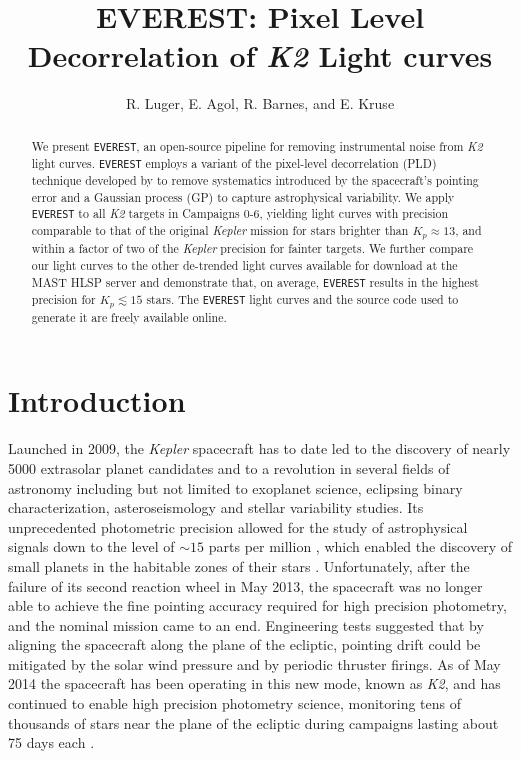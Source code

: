\documentclass[]{emulateapj}
\begin{document}
\title{EVEREST: Pixel Level Decorrelation of \emph{K2} Light curves}

\author{R. Luger, E. Agol, R. Barnes, and E. Kruse}

\begin{abstract}
We present \texttt{EVEREST}, an open-source pipeline for removing instrumental noise
from \emph{K2} light curves. \texttt{EVEREST} employs a variant of the pixel-level decorrelation (PLD)
technique developed by \cite{DEM15} to remove systematics introduced by the spacecraft's 
pointing error and a Gaussian process (GP) to capture astrophysical variability. We
apply \texttt{EVEREST} to all \emph{K2} targets in Campaigns 0-6, yielding light curves
with precision comparable to that of the original \emph{Kepler} mission for stars brighter
than $K_p \approx 13$, and within a factor of two of the \emph{Kepler} precision for fainter
targets. We further compare our light curves to the other de-trended light curves available
for download at the MAST HLSP server and demonstrate that, on average, \texttt{EVEREST} results 
in the highest precision for $K_p \lesssim 15$ stars. The \texttt{EVEREST} light curves and the source code
used to generate it are freely available online.
\end{abstract}

\section{Introduction}
\label{sec:intro}
Launched in 2009, the \emph{Kepler} spacecraft has to date led to the discovery
of nearly 5000 extrasolar planet candidates
and to a revolution in several fields of astronomy including but not limited to
exoplanet science, eclipsing binary characterization, asteroseismology and stellar variability studies.
Its unprecedented photometric precision allowed for the study of astrophysical signals
down to the level of $\sim 15$ parts per million \citep{GIL11}, which enabled the discovery
of small planets in the habitable zones of their stars \citep[e.g.,][]{BOR13,QUI14,TOR15}.
Unfortunately, after the failure of its second reaction wheel in May 2013, the spacecraft was
no longer able to achieve the fine pointing accuracy required for high precision photometry,
and the nominal mission came to an end. Engineering tests suggested that by aligning
the spacecraft along the plane of the ecliptic, pointing drift could be mitigated
by the solar wind pressure and by periodic thruster firings. As of May 2014 the spacecraft has been operating in
this new mode, known as \emph{K2}, and has continued to enable high precision photometry
science, monitoring tens of thousands of stars near the plane of the ecliptic during campaigns 
lasting about 75 days each \citep{HOW14}.
\end{document}
